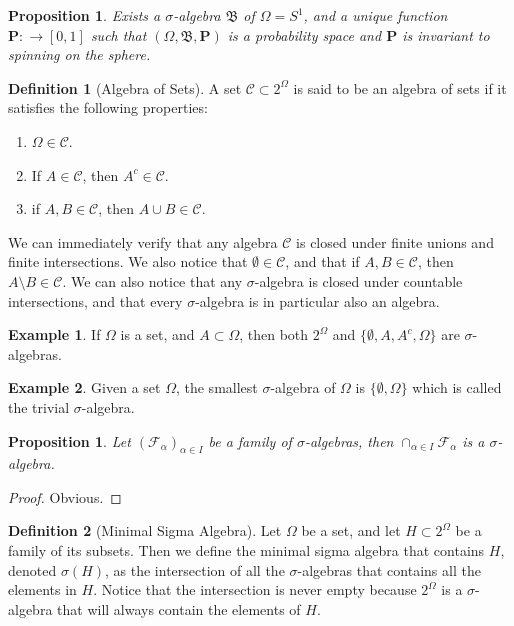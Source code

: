 \documentclass[11pt,a4paper]{article}
\theoremstyle{definition}
\newtheorem{definition}{Definition}[section]
\newtheorem{example}{Example}[section]
\theoremstyle{plain}
\newtheorem{proposition}[theorem]{Proposition}
\newcommand{\Prob}{\mathbf{P}}
\begin{document}
  \begin{proposition}
    Exists a $\sigma$-algebra $\mathfrak B$ of $\Omega = S^1$, and a unique
    function $\Prob \colon \mathfrak \to [0,1]$ such that 
    $(\Omega, \mathfrak B, \Prob)$ is a probability space and $\Prob$
    is invariant to spinning on the sphere.
  \end{proposition}

  \begin{definition}[Algebra of Sets]
    A set $\mathcal C \subset 2^\Omega$ is said to be an algebra of sets if it 
    satisfies the following properties:
    \begin{enumerate}
      \item $\Omega \in \mathcal C$.
      \item If $A \in \mathcal C$, then $A^c \in \mathcal C$.
      \item if $A,B \in \mathcal C$, then $A \cup B \in \mathcal C$.
    \end{enumerate}
  \end{definition}

  We can immediately verify that any algebra $\mathcal C$ is closed under
  finite unions and finite intersections. We also notice that 
  $\emptyset \in \mathcal C$, and that if $A,B \in \mathcal C$, then
  $A \setminus B \in \mathcal C$. We can also notice that any 
  $\sigma$-algebra is closed under countable intersections, and that
  every $\sigma$-algebra is in particular also an algebra.

  \begin{example}
    If $\Omega$ is a set, and $A \subset \Omega$, then both $2^\Omega$ and 
    $\{\emptyset, A, A^c, \Omega\}$ are $\sigma$-algebras.
  \end{example}

  \begin{example}
    Given a set $\Omega$, the smallest $\sigma$-algebra of $\Omega$ is
    $\{\emptyset, \Omega\}$ which is called the trivial $\sigma$-algebra.
  \end{example}
  
  \begin{proposition}
    Let $(\mathcal F_\alpha)_{\alpha \in I}$ be a family of $\sigma$-algebras,
    then $\cap_{\alpha \in I}{\mathcal F_\alpha}$ is a $\sigma$-algebra.
  \end{proposition}
  \begin{proof}
    Obvious.
  \end{proof}

  \begin{definition}[Minimal Sigma Algebra]
    Let $\Omega$ be a set, and let $H \subset 2^\Omega$ be a family of its
    subsets. Then we define the minimal sigma algebra that contains $H$,
    denoted $\sigma(H)$, as the intersection of all the $\sigma$-algebras
    that contains all the elements in $H$. Notice that the intersection is
    never empty because $2^\Omega$ is a $\sigma$-algebra that will always
    contain the elements of $H$.
  \end{definition}
\end{document}
